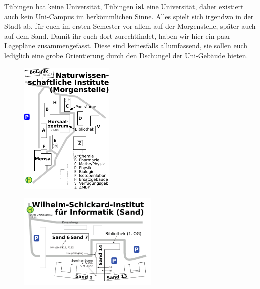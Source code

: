 Tübingen hat keine Universität, Tübingen \textbf{ist} eine Universität, daher existiert auch kein Uni-Campus im herkömmlichen Sinne. Alles spielt sich irgendwo in der Stadt ab, für euch im ersten Semester vor allem auf der Morgenstelle, später auch auf dem Sand. Damit ihr euch dort zurechtfindet, haben wir hier ein paar Lagepläne zusammengefasst. Diese sind keinesfalls allumfassend, sie sollen euch lediglich eine grobe Orientierung durch den Dschungel der Uni-Gebäude bieten.
\begin{figure}[ht!]
\centering
\includegraphics[width=0.4\textwidth]{shared/anhang/lageplaene/uebersicht_morgenstelle.pdf}
\end{figure}
\begin{figure}[ht!]
	\centering
	\includegraphics[width=0.6\textwidth]{shared/anhang/lageplaene/uebersicht_sand.pdf}
\end{figure}
